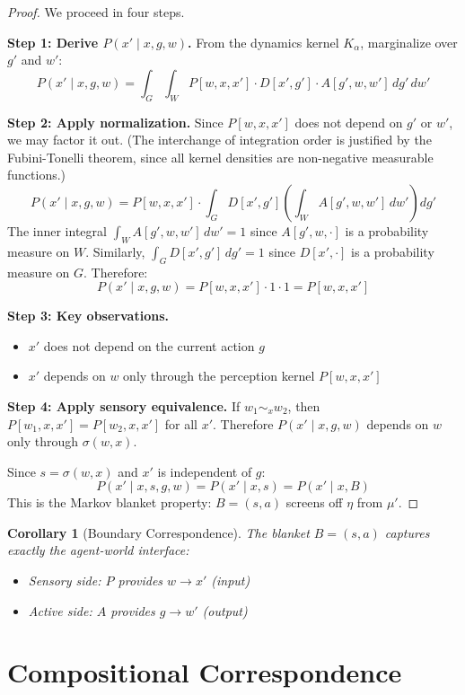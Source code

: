 \documentclass[11pt,a4paper]{article}
\newtheorem{corollary}[theorem]{Corollary}
\begin{document}
\begin{proof}
We proceed in four steps.

\textbf{Step 1: Derive $P(x' \mid x, g, w)$.}
From the dynamics kernel $K_\alpha$, marginalize over $g'$ and $w'$:
\[
P(x' \mid x, g, w) = \int_G \int_W P[w, x, x'] \cdot D[x', g'] \cdot A[g', w, w'] \, dg' \, dw'
\]

\textbf{Step 2: Apply normalization.}
Since $P[w, x, x']$ does not depend on $g'$ or $w'$, we may factor it out. (The interchange of integration order is justified by the Fubini-Tonelli theorem, since all kernel densities are non-negative measurable functions.)
\[
P(x' \mid x, g, w) = P[w, x, x'] \cdot \int_G D[x', g'] \left( \int_W A[g', w, w'] \, dw' \right) dg'
\]
The inner integral $\int_W A[g', w, w'] \, dw' = 1$ since $A[g', w, \cdot]$ is a probability measure on $W$. Similarly, $\int_G D[x', g'] \, dg' = 1$ since $D[x', \cdot]$ is a probability measure on $G$. Therefore:
\[
P(x' \mid x, g, w) = P[w, x, x'] \cdot 1 \cdot 1 = P[w, x, x']
\]

\textbf{Step 3: Key observations.}
\begin{itemize}[nosep]
    \item $x'$ does not depend on the current action $g$
    \item $x'$ depends on $w$ only through the perception kernel $P[w, x, x']$
\end{itemize}

\textbf{Step 4: Apply sensory equivalence.}
If $w_1 \sim_x w_2$, then $P[w_1, x, x'] = P[w_2, x, x']$ for all $x'$. Therefore $P(x' \mid x, g, w)$ depends on $w$ only through $\sigma(w, x)$.

Since $s = \sigma(w, x)$ and $x'$ is independent of $g$:
\[
P(x' \mid x, s, g, w) = P(x' \mid x, s) = P(x' \mid x, B)
\]
This is the Markov blanket property: $B = (s, a)$ screens off $\eta$ from $\mu'$.
\end{proof}

\begin{corollary}[Boundary Correspondence]\label{cor:boundary}
The blanket $B = (s, a)$ captures exactly the agent-world interface:
\begin{itemize}[nosep]
    \item Sensory side: $P$ provides $w \to x'$ (input)
    \item Active side: $A$ provides $g \to w'$ (output)
\end{itemize}
\end{corollary}

\section{Compositional Correspondence}
\end{document}
